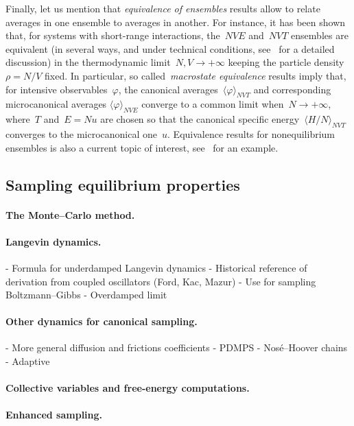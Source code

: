 Finally, let us mention that \textit{equivalence of ensembles} results allow to relate averages in one ensemble to averages in another. For instance, it has been shown that, for systems with short-range interactions, the~$NVE$ and~$NVT$ ensembles are equivalent (in several ways, and under technical conditions, see~\cite{T15} for a detailed discussion) in the thermodynamic limit~$N,V\to +\infty$ keeping the particle density~$\rho = N/V$ fixed.
In particular, so called~\textit{macrostate equivalence} results imply that, for intensive observables~$\varphi$, the canonical averages~$\langle\varphi\rangle_{NVT}$  and corresponding microcanonical averages $\langle \varphi\rangle_{NVE}$ converge to a common limit when~$N\to +\infty$, where~$T$ and~${E=Nu}$ are chosen so that the canonical specific energy~$\langle H/N\rangle_{NVT}$ converges to the microcanonical one~$u$.
Equivalence results for nonequilibrium ensembles is also a current topic of interest, see~\cite{CT13} for an example.

\subsection{Sampling equilibrium properties}
\label{subsec:01:sampling}

\paragraph{The Monte--Carlo method.}

\paragraph{Langevin dynamics.}
- Formula for underdamped Langevin dynamics
- Historical reference of derivation from coupled oscillators (Ford, Kac, Mazur)
- Use for sampling Boltzmann--Gibbs
- Overdamped limit

\paragraph{Other dynamics for canonical sampling.}
- More general diffusion and frictions coefficients
- PDMPS
- Nosé--Hoover chains
- Adaptive

\paragraph{Collective variables and free-energy computations.}

\paragraph{Enhanced sampling.}

